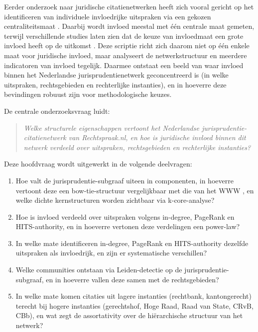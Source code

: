 \documentclass[a4paper, 12pt]{report}
\begin{document}
Eerder onderzoek naar juridische citatienetwerken heeft zich vooral gericht op het identificeren van individuele invloedrijke uitspraken via een gekozen centraliteitsmaat \parencite{fowler2008, fowler2007, vanopijnen2012, winkels2012}. Daarbij wordt invloed meestal met één centrale maat gemeten, terwijl verschillende studies laten zien dat de keuze van invloedmaat een grote invloed heeft op de uitkomst \parencite{fowler2008, vanopijnen2012}. Deze scriptie richt zich daarom niet op één enkele maat voor juridische invloed, maar analyseert de netwerkstructuur en meerdere indicatoren van invloed tegelijk. Daarmee ontstaat een beeld van waar invloed binnen het Nederlandse jurisprudentienetwerk geconcentreerd is (in welke uitspraken, rechtsgebieden en rechterlijke instanties), en in hoeverre deze bevindingen robuust zijn voor methodologische keuzes.

De centrale onderzoeksvraag luidt:

\begin{quote}
\textit{Welke structurele eigenschappen vertoont het Nederlandse jurisprudentie-citatienetwerk van Rechtspraak.nl, en hoe is juridische invloed binnen dit netwerk verdeeld over uitspraken, rechtsgebieden en rechterlijke instanties?}
\end{quote}

Deze hoofdvraag wordt uitgewerkt in de volgende deelvragen:

\begin{enumerate}
  \item Hoe valt de jurisprudentie-subgraaf uiteen in componenten, in hoeverre vertoont deze een bow-tie-structuur vergelijkbaar met die van het WWW \parencite{broder2000}, en welke dichte kernstructuren worden zichtbaar via k-core-analyse?
  \item Hoe is invloed verdeeld over uitspraken volgens in-degree, PageRank en HITS-authority, en in hoeverre vertonen deze verdelingen een power-law?
  \item In welke mate identificeren in-degree, PageRank en HITS-authority dezelfde uitspraken als invloedrijk, en zijn er systematische verschillen?
  \item Welke communities ontstaan via Leiden-detectie \parencite{traag2019} op de jurisprudentie-subgraaf, en in hoeverre vallen deze samen met de rechtsgebieden?
  \item In welke mate komen citaties uit lagere instanties (rechtbank, kantongerecht) terecht bij hogere instanties (gerechtshof, Hoge Raad, Raad van State, CRvB, CBb), en wat zegt de assortativity over de hiërarchische structuur van het netwerk?
\end{enumerate}
\end{document}
